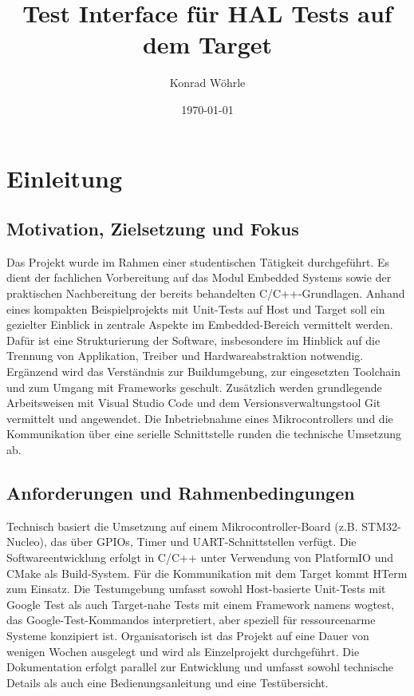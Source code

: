 \documentclass[12pt,a4paper]{article}
\title{Test Interface für HAL Tests auf dem Target}
\author{Konrad Wöhrle}
\date{\today}
\begin{document}
\maketitle
\newpage

\tableofcontents
\newpage

\section{Einleitung}
\subsection{Motivation, Zielsetzung und Fokus}

Das Projekt wurde im Rahmen einer studentischen Tätigkeit durchgeführt.
Es dient der fachlichen Vorbereitung auf das Modul Embedded Systems sowie der praktischen Nachbereitung der bereits behandelten C/C++-Grundlagen.
\newline
Anhand eines kompakten Beispielprojekts mit Unit-Tests auf Host und Target soll ein gezielter Einblick in zentrale Aspekte im Embedded-Bereich vermittelt werden.
Dafür ist eine Strukturierung der Software, insbesondere im Hinblick auf die Trennung von Applikation, Treiber und Hardwareabstraktion notwendig.
Ergänzend wird das Verständnis zur Buildumgebung, zur eingesetzten Toolchain und zum Umgang mit Frameworks geschult.
Zusätzlich werden grundlegende Arbeitsweisen mit Visual Studio Code und dem Versionsverwaltungstool Git vermittelt und angewendet.
Die Inbetriebnahme eines Mikrocontrollers und die Kommunikation über eine serielle Schnittstelle runden die technische Umsetzung ab.

\subsection{Anforderungen und Rahmenbedingungen}
Technisch basiert die Umsetzung auf einem Mikrocontroller-Board (z.B. STM32-Nucleo), das über GPIOs, Timer und UART-Schnittstellen verfügt.
Die Softwareentwicklung erfolgt in C/C++ unter Verwendung von PlatformIO und CMake als Build-System.
Für die Kommunikation mit dem Target kommt HTerm zum Einsatz.
Die Testumgebung umfasst sowohl Host-basierte Unit-Tests mit Google Test als auch Target-nahe Tests mit einem  Framework namens wogtest,
das Google-Test-Kommandos interpretiert, aber speziell für ressourcenarme Systeme konzipiert ist.
\newline
Organisatorisch ist das Projekt auf eine Dauer von wenigen Wochen ausgelegt und wird als Einzelprojekt durchgeführt.
Die Dokumentation erfolgt parallel zur Entwicklung und umfasst sowohl technische Details als auch eine Bedienungsanleitung und eine Testübersicht.
\end{document}
